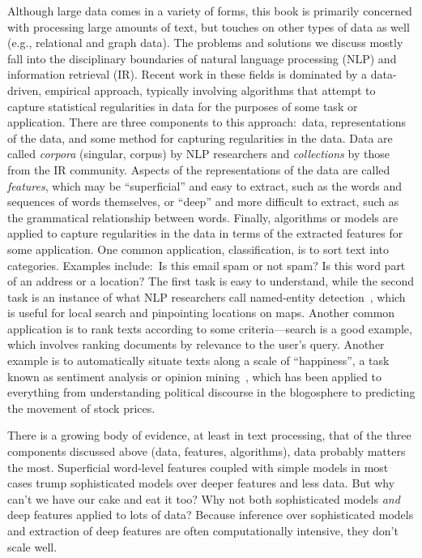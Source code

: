Although large data comes in a variety of forms, this book is
primarily concerned with processing large amounts of text, but touches
on other types of data as well (e.g., relational and graph data). The
problems and solutions we discuss mostly fall into the disciplinary
boundaries of natural language processing (NLP) and information
retrieval (IR).  Recent work in these fields is dominated by a
data-driven, empirical approach, typically involving algorithms that
attempt to capture statistical regularities in data for the purposes
of some task or application.  There are three components to this
approach:\ data, representations of the data, and some method for
capturing regularities in the data.  Data are called \emph{corpora}
(singular, corpus) by NLP researchers and \emph{collections} by those
from the IR community.  Aspects of the representations of the data are
called \emph{features}, which may be ``superficial'' and easy to
extract, such as the words and sequences of words themselves, or
``deep'' and more difficult to extract, such as the grammatical
relationship between words.  Finally, algorithms or models are applied
to capture regularities in the data in terms of the extracted features
for some application.  One common application, classification, is to
sort text into categories.  Examples include:\ Is this email spam or
not spam?  Is this word part of an address or a location?  The first
task is easy to understand, while the second task is an instance of
what NLP researchers call named-entity
detection~\cite{Sekine_Ranchhod_2009}, which is useful for local
search and pinpointing locations on maps.  Another common application
is to rank texts according to some criteria---search is a good
example, which involves ranking documents by relevance to the user's
query.  Another example is to automatically situate texts along a
scale of ``happiness'', a task known as sentiment analysis or opinion
mining~\cite{Pang_Lee_2008}, which has been applied to everything from
understanding political discourse in the blogosphere to predicting the
movement of stock prices.

There is a growing body of evidence, at least in text processing, that
of the three components discussed above (data, features, algorithms),
data probably matters the most.  Superficial word-level features
coupled with simple models in most cases trump sophisticated models
over deeper features and less data.  But why can't we have our cake
and eat it too?  Why not both sophisticated models \emph{and} deep
features applied to lots of data?  Because inference over
sophisticated models and extraction of deep features are often
computationally intensive, they don't scale well.


